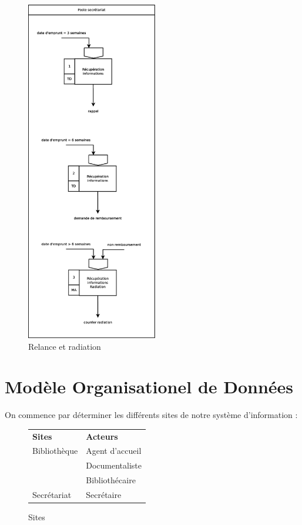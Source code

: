 \begin{figure}[!htb]
    \begin{center}
    \includegraphics[height=15cm]{images/cc1_mot4.eps}
    \caption{\label{cc1_mot4} Relance et radiation}
    \end{center}
\end{figure}

\newpage
\section*{Modèle Organisationel de Données}

On commence par déterminer les différents sites de notre système d'information :\\

\begin{figure}[!h]
\begin{tabular}{l l}
%
    \textbf{Sites} & \textbf{Acteurs} \\
    Bibliothèque & Agent d'accueil \\
                 & Documentaliste \\
                 & Bibliothécaire \\
    Secrétariat  & Secrétaire \\
%
\end{tabular}
    \caption{\label{sites} Sites}
\end{figure}

